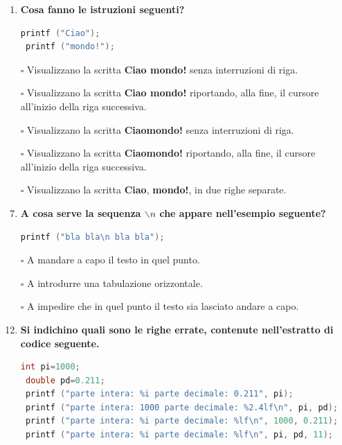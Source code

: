 \documentclass[11pt]{article}
\begin{document}
\begin{enumerate}
 \item {\bf Cosa fanno le istruzioni seguenti?}
 
 \begin{lstlisting}[language=c]
 printf ("Ciao");
 printf ("mondo!");
  \end{lstlisting}
 
\item[$\square$] Visualizzano la scritta {\bf Ciao mondo!} senza interruzioni di riga.
\item[$\square$] Visualizzano la scritta {\bf Ciao mondo!} riportando, alla fine, il cursore all'inizio della riga successiva.
\item[$\square$] Visualizzano la scritta {\bf Ciaomondo!} senza interruzioni di riga.
\item[$\square$] Visualizzano la scritta {\bf Ciaomondo!} riportando, alla fine, il cursore all'inizio della riga successiva.
\item[$\square$] Visualizzano la scritta {\bf Ciao}, {\bf mondo!}, in due righe separate.
 
 
 \item  {\bf A cosa serve la sequenza $\backslash n$ che appare nell'esempio seguente?}
 \begin{lstlisting}[language=c]
 printf ("bla bla\n bla bla");
 \end{lstlisting}
 
\item[$\square$]  A mandare a capo il testo in quel punto.
\item[$\square$]  A introdurre una tabulazione orizzontale.
\item[$\square$]  A impedire che in quel punto il testo sia lasciato andare a capo.


\item [\nonumber]
\item {\bf Si indichino quali sono le righe errate, contenute nell'estratto di codice seguente.}
\item [\nonumber]
\item [\nonumber]

 \begin{lstlisting}[language=c]
 int pi=1000;
 double pd=0.211;
 printf ("parte intera: %i parte decimale: 0.211", pi);
 printf ("parte intera: 1000 parte decimale: %2.4lf\n", pi, pd);
 printf ("parte intera: %i parte decimale: %lf\n", 1000, 0.211);
 printf ("parte intera: %i parte decimale: %lf\n", pi, pd, 11);
 \end{lstlisting}
 

\end{enumerate}
\end{document}
